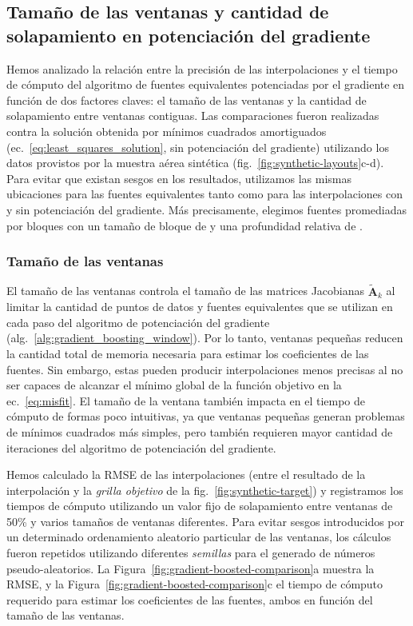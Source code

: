 

\subsection{Tamaño de las ventanas y cantidad de solapamiento en potenciación
del gradiente}
\label{sec:window_size_and_overlap}

Hemos analizado la relación entre la precisión de las interpolaciones y el
tiempo de cómputo del algoritmo de fuentes equivalentes potenciadas por el
gradiente en función de dos factores claves: el tamaño de las ventanas y la
cantidad de solapamiento entre ventanas contiguas.
Las comparaciones fueron realizadas contra la solución obtenida por mínimos
cuadrados amortiguados (ec.~\ref{eq:least_squares_solution}, sin potenciación
del gradiente) utilizando los datos provistos por la muestra aérea sintética
(fig.~\ref{fig:synthetic-layouts}c-d).
Para evitar que existan sesgos en los resultados, utilizamos las mismas
ubicaciones para las fuentes equivalentes tanto como para las interpolaciones
con y sin potenciación del gradiente.
Más precisamente, elegimos fuentes promediadas por bloques con un tamaño de
bloque de
\BestAirborneBlockAveragedSourcesRelativeDepthSpacing\m{} y una profundidad
relativa de
\BestAirborneBlockAveragedSourcesRelativeDepthDepth\m{}.

\subsubsection{Tamaño de las ventanas}
\label{sec:window_size}

El tamaño de las ventanas controla el tamaño de las matrices Jacobianas
$\tilde{\mathbf{A}}_k$ al limitar la cantidad de puntos de datos y fuentes
equivalentes que se utilizan en cada paso del algoritmo de potenciación del
gradiente
(alg.~\ref{alg:gradient_boosting_window}).
Por lo tanto, ventanas pequeñas reducen la cantidad total de memoria necesaria
para estimar los coeficientes de las fuentes.
Sin embargo, estas pueden producir interpolaciones menos precisas al no ser
capaces de alcanzar el mínimo global de la función objetivo en la
ec.~\ref{eq:misfit}.
El tamaño de la ventana también impacta en el tiempo de cómputo de formas poco
intuitivas, ya que ventanas pequeñas generan problemas de mínimos cuadrados más
simples, pero también requieren mayor cantidad de iteraciones del algoritmo de
potenciación del gradiente.

Hemos calculado la \ac{RMSE} de las interpolaciones (entre el resultado de la
interpolación y la \emph{grilla objetivo} de la
fig.~\ref{fig:synthetic-target}) y registramos los tiempos de cómputo
utilizando un valor fijo de solapamiento entre ventanas de 50\% y varios
tamaños de ventanas diferentes.
Para evitar sesgos introducidos por un determinado ordenamiento aleatorio
particular de las ventanas, los cálculos fueron repetidos utilizando diferentes
\emph{semillas} para el generado de números pseudo-aleatorios.
La Figura~\ref{fig:gradient-boosted-comparison}a
muestra la \ac{RMSE}, y
la Figura~\ref{fig:gradient-boosted-comparison}c
el tiempo de cómputo requerido para estimar los coeficientes de las fuentes,
ambos en función del tamaño de las ventanas.

